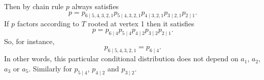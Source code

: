 Then by chain rule $p$ always satisfies
\[
p = p_{6 \mid 5, 4, 3, 2, 1}p_{5 \mid 4, 3, 2, 1}p_{4 \mid 3, 2, 1} p_{3 \mid 2, 1}p_{2 \mid 1}.
\]
If $p$ factors according to $T$ rooted at vertex 1 then it satisfies
\[
p = p_{6 \mid 4}p_{5 \mid 4}p_{4 \mid 2}p_{3 \mid 2}p_{2 \mid 1}.
\]
So, for instance,
\[
p_{6 \mid 5, 4, 3, 2, 1} = p_{6 \mid 4}.
\]
In other words, this particular conditional distribution does not depend on $a_1$, $a_2$, $a_3$ or $a_5$.
Similarly for $p_{5 \mid 4}$, $p_{4 \mid 2}$ and $p_{3 \mid 2}$.

